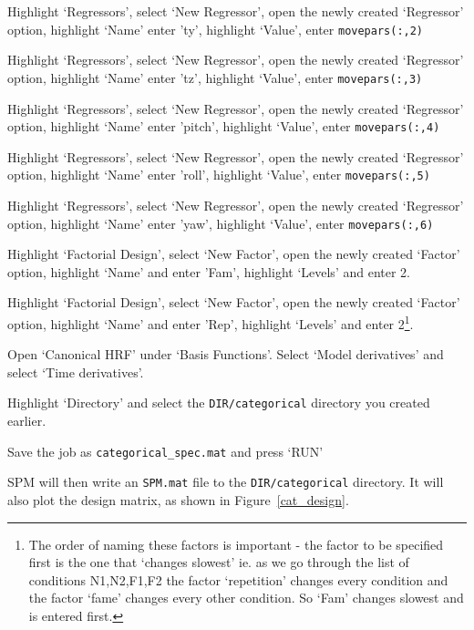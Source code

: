 \item{Highlight `Regressors', select `New Regressor', open the newly created `Regressor' option, highlight `Name' enter 'ty', highlight `Value', enter \verb!movepars(:,2)!}
\item{Highlight `Regressors', select `New Regressor', open the newly created `Regressor' option, highlight `Name' enter 'tz', highlight `Value', enter \verb!movepars(:,3)!}
\item{Highlight `Regressors', select `New Regressor', open the newly created `Regressor' option, highlight `Name' enter 'pitch', highlight `Value', enter \verb!movepars(:,4)!}
\item{Highlight `Regressors', select `New Regressor', open the newly created `Regressor' option, highlight `Name' enter 'roll', highlight `Value', enter \verb!movepars(:,5)!}
\item{Highlight `Regressors', select `New Regressor', open the newly created `Regressor' option, highlight `Name' enter 'yaw', highlight `Value', enter \verb!movepars(:,6)!}
\item{Highlight `Factorial Design', select `New Factor', open the newly created `Factor' option, highlight `Name' and enter 'Fam', highlight `Levels' and enter 2.}
\item{Highlight `Factorial Design', select `New Factor', open the newly created `Factor' option, highlight `Name' and enter 'Rep', highlight `Levels' and enter 2\footnote{The order of naming these factors is important - the factor to be specified first is the one that `changes slowest' ie. as we go through the list of conditions N1,N2,F1,F2 the factor `repetition' changes every condition and the factor `fame' changes every other condition. So `Fam' changes slowest and is entered first.}.}
\item{Open `Canonical HRF' under `Basis Functions'. Select `Model derivatives' and select `Time derivatives'.}
\item{Highlight `Directory' and select the \verb!DIR/categorical! directory you created earlier.}
\item{Save the job as \verb!categorical_spec.mat! and press `RUN'}
\ei

SPM will then write an \verb$SPM.mat$ file to the \verb!DIR/categorical! directory. It will also plot the design matrix, as shown in Figure~\ref{cat_design}. 

